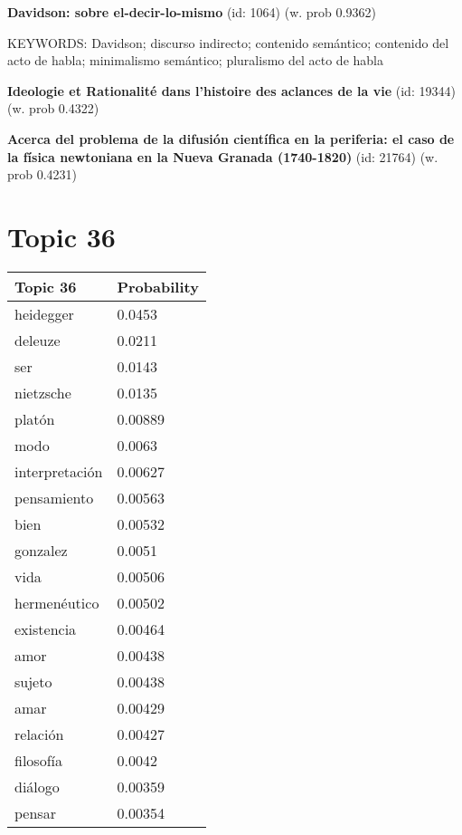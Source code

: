 \documentclass{article}
\begin{document}
\textbf{Davidson: sobre el-decir-lo-mismo} (id: 1064)
 (w. prob 0.9362)


KEYWORDS:
Davidson; discurso indirecto; contenido semántico; contenido del acto de habla; minimalismo semántico; pluralismo del acto de habla
\vfill

\textbf{Ideologie et Rationalité dans l'histoire des aclances de la vie} (id: 19344)
 (w. prob 0.4322)
\vfill

\textbf{Acerca del problema de la difusión científica en la periferia: el caso de la física newtoniana en la Nueva Granada (1740-1820)} (id: 21764)
 (w. prob 0.4231)

\vfill
\newpage


\centering
\thispagestyle{empty}
\section*{Topic 36}\vfill
\begin{tabular}{ll}
\toprule
       Topic 36 & Probability \\
\midrule
      heidegger &      0.0453 \\
        deleuze &      0.0211 \\
            ser &      0.0143 \\
      nietzsche &      0.0135 \\
         platón &     0.00889 \\
           modo &      0.0063 \\
 interpretación &     0.00627 \\
    pensamiento &     0.00563 \\
           bien &     0.00532 \\
       gonzalez &      0.0051 \\
           vida &     0.00506 \\
   hermenéutico &     0.00502 \\
     existencia &     0.00464 \\
           amor &     0.00438 \\
         sujeto &     0.00438 \\
           amar &     0.00429 \\
       relación &     0.00427 \\
      filosofía &      0.0042 \\
        diálogo &     0.00359 \\
         pensar &     0.00354 \\
\bottomrule
\end{tabular}
\end{document}

